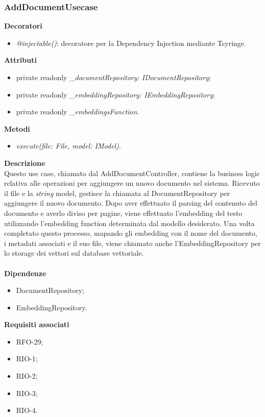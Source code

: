 \subsubsection{AddDocumentUsecase}
\textbf{Decoratori}
\begin{itemize}
    \item \textit{@injectable()}: decoratore per la Dependency Injection mediante Tsyringe.
\end{itemize}
\textbf{Attributi}
\begin{itemize}[itemsep=-4pt]
    \item private readonly \textit{\_documentRepository: IDocumentRepository};
    \item private readonly \textit{\_embeddingRepository: IEmbeddingRepository};
    \item private readonly \textit{\_embeddingsFunction}.
\end{itemize}
\textbf{Metodi}
\begin{itemize}
    \item \textit{execute(file: File, model: IModel)}.
\end{itemize}
\textbf{Descrizione}\\
Questo use case, chiamato dal AddDocumentController, contiene la business logic relativa alle operazioni per aggiungere un nuovo documento nel sistema. Ricevuto il file e la \textit{string} model, gestisce la chiamata al DocumentRepository per aggiungere il nuovo documento. Dopo aver effettuato il parsing del contenuto del documento e averlo diviso per pagine, viene effettuato l'embedding del testo utilizzando l'embedding function determinata dal modello desiderato. Una volta completato questo processo, mapando gli embedding con il nome del documento, i metadati associati e il suo file, viene chiamato anche l'EmbeddingRepository per lo storage dei vettori sul database vettoriale. \\ \\
\textbf{Dipendenze}
\begin{itemize}[itemsep=-4pt]
    \item DocumentRepository;
    \item EmbeddingRepository.
\end{itemize}
\textbf{Requisiti associati}
\begin{itemize}[itemsep=-4pt]
    \item RFO-29;
    \item RIO-1;
    \item RIO-2;
    \item RIO-3;
    \item RIO-4.
\end{itemize}

